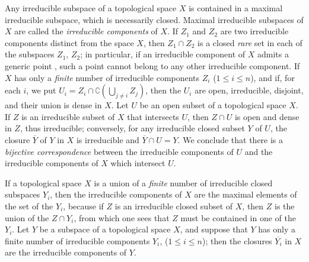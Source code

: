 \begin{env}[2.1.6]
\label{0.2.1.6}
Any irreducible subspace of a topological space $X$ is contained in a maximal irreducible subspace, which is necessarily closed.
Maximal irreducible subspaces of $X$ are called the \emph{irreducible components} of $X$.
If $Z_1$ and $Z_2$ are two irreducible components distinct from the space $X$, then $Z_1\cap Z_2$ is a closed \emph{rare} set in each of the subspaces $Z_1$, $Z_2$; in particular, if an irreducible component of $X$ admits a generic point , such a point cannot belong to any other irreducible component.
If $X$ has only a \emph{finite} number of irreducible components $Z_i$ ($1\leqslant i\leqslant n$), and if, for each $i$, we put
$U_i=Z_i\cap\complement{(\bigcup_{j\neq i}Z_j)}$, then the $U_i$ are open, irreducible, disjoint, and their union is dense in $X$.
Let $U$ be an open subset of a topological space $X$.
If $Z$ is an irreducible subset of $X$ that intersects $U$, then $Z\cap U$ is open and dense in $Z$, thus irreducible; conversely, for any irreducible closed subset $Y$ of $U$, the closure $\overline{Y}$ of $Y$ in $X$ is irreducible and $\overline{Y}\cap U=Y$.
We conclude that there is a \emph{bijective correspondence} between the irreducible components of $U$ and the irreducible components of $X$ which intersect $U$.
\end{env}

\begin{env}[2.1.7]
\label{0.2.1.7}
If a topological space $X$ is a union of a \emph{finite} number of irreducible closed subspaces $Y_i$, then the irreducible components of $X$ are the maximal elements of the set of the $Y_i$, because if $Z$ is an irreducible closed subset of $X$, then $Z$ is the union of the $Z\cap Y_i$, from which one sees that $Z$ must be contained in one of the $Y_i$.
Let $Y$ be a subspace of a topological space $X$, and suppose that $Y$ has only a finite number of irreducible components $Y_i$, ($1\leqslant i\leqslant n$); then the closures $\overline{Y_i}$ in $X$ are the irreducible components of $Y$.
\end{env}

